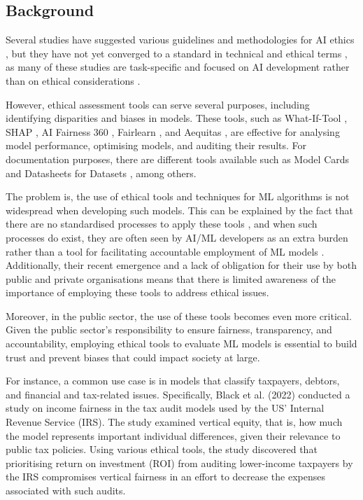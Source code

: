 \documentclass[fleqn,10pt]{wlscirep}
\begin{document}
\subsection{Background}

Several studies have suggested various guidelines and methodologies for AI ethics \cite{Floridi2018,baron2019interpretable,Boddington_2017,Mittelstadt_2019,10.1145/3442188.3445919},  but they have not yet converged to a standard in technical and ethical terms \cite{Hagendorff2020,fjeld2020principled,Jobin2019,zeng2018linking},  as many of these studies are task-specific and focused on AI development rather than on ethical considerations \cite{Ayling2022,Morley2020}.

However, ethical assessment tools can serve several purposes, including identifying disparities and biases in models. These tools, such as What-If-Tool \cite{wexler_2018}, SHAP \cite{NIPS2017_7062}, AI Fairness 360 \cite{aif360-oct-2018}, Fairlearn \cite{weerts2023fairlearn}, and Aequitas \cite{DBLP:journals/corr/abs-1811-05577}, are effective for analysing model performance, optimising models, and auditing their results. For documentation purposes, there are different tools available such as Model Cards \cite{DBLP:journals/corr/abs-1810-03993} and Datasheets for Datasets \cite{DBLP:journals/corr/abs-1803-09010}, among others. 

The problem is, the use of ethical tools and techniques for ML algorithms is not widespread when developing such models. This can be explained by the fact that there are no standardised processes to apply these tools \cite{agarwal2022sevenlayermodelstandardisingai}, and when such processes do exist, they are often seen by AI/ML developers as an extra burden rather than a tool for facilitating accountable employment of ML models \cite{https://doi.org/10.48550/arxiv.2206.02923,ijcai2023p735}. Additionally, their recent emergence and a lack of obligation for their use by both public and private organisations means that there is limited awareness of the importance of employing these tools to address ethical issues.

Moreover, in the public sector, the use of these tools becomes even more critical. Given the public sector’s responsibility to ensure fairness, transparency, and accountability, employing ethical tools to evaluate ML models is essential to build trust and prevent biases that could impact society at large.

For instance, a common use case is in models that classify taxpayers, debtors, and financial and tax-related issues. Specifically, Black et al. (2022) \cite{10.1145/3531146.3533204} conducted a study on income fairness in the tax audit models used by the US' Internal Revenue Service (IRS). The study examined vertical equity, that is, how much the model represents important individual differences, given their relevance to public tax policies. Using various ethical tools, the study discovered that prioritising return on investment (ROI) from auditing lower-income taxpayers by the IRS compromises vertical fairness in an effort to decrease the expenses associated with such audits.
\end{document}
